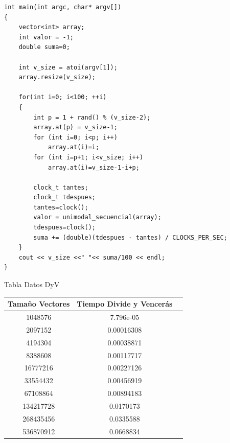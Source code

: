 \documentclass[12pt]{beamer}
\begin{document}
\begin{frame}[fragile]
	\begin{lstlisting}
int main(int argc, char* argv[])
{
	vector<int> array;
  	int valor = -1;
	double suma=0;

  	int v_size = atoi(argv[1]);
  	array.resize(v_size);

	for(int i=0; i<100; ++i)
	{
		int p = 1 + rand() % (v_size-2);
  		array.at(p) = v_size-1;
  		for (int i=0; i<p; i++)
  			array.at(i)=i;
  		for (int i=p+1; i<v_size; i++)
  			array.at(i)=v_size-1-i+p;

  		clock_t tantes;
  		clock_t tdespues;
  		tantes=clock();
  		valor = unimodal_secuencial(array);
  		tdespues=clock();
		suma += (double)(tdespues - tantes) / CLOCKS_PER_SEC;
	}
  	cout << v_size <<" "<< suma/100 << endl;
}
	\end{lstlisting}

\end{frame}

\begin{frame}{Tabla Datos DyV}
\centering
\begin{tabular}{|c|c|c|}
\hline 
Tamaño Vectores & Tiempo Divide y Vencerás \\ 
\hline 
1048576 & 7.796e-05 \\ 
\hline 
2097152 & 0.00016308  \\ 
\hline 
4194304 & 0.00038871  \\ 
\hline 
8388608 & 0.00117717  \\ 
\hline 
16777216 & 0.00227126  \\ 
\hline 
33554432 & 0.00456919  \\ 
\hline 
67108864 & 0.00894183  \\ 
\hline 
134217728 & 0.0170173  \\ 
\hline 
268435456 & 0.0335588 \\ 
\hline 
536870912 & 0.0668834 \\ 
\hline 
\end{tabular} 

\end{frame}
\end{document}
